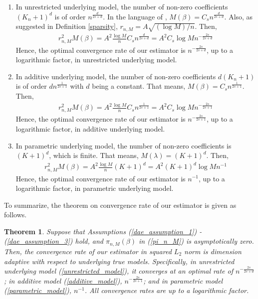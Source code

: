 \documentclass[12pt, a4paper]{article}
\theoremstyle{MAstyle} \newtheorem{assumption}{Assumption}[section]
\theoremstyle{MAstyle} \newtheorem{definition}{Definition}[section]
\theoremstyle{MAstyle} \newtheorem{theorem}{Theorem}[section]
\theoremstyle{MAstyle} \newtheorem{corollary}{Corollary}[section]
\begin{document}
                    \begin{enumerate}[label=(\alph*), noitemsep]
                        \item In unrestricted underlying model, the number of non-zero coefficients $(K_n+1)^d$ is of order $n^{\frac{d}{2s+d}}$. In the language of \cite{Bunea_2007}, $M(\beta)=C_sn^{\frac{d}{2s+d}}$. Also, as suggested in Definition \ref{sparsity}, $r_{n,M}=A\sqrt{(\log M)/n}$. Then,
                        \begin{align*}
                            r_{n,M}^2M(\beta)= A^2 \frac{\log M}{n} C_sn^{\frac{d}{2s+d}} = A^2C_s \log M n^{-\frac{2s}{2s+d}}
                        \end{align*}
                        Hence, the optimal convergence rate of our estimator is $n^{-\frac{2s}{2s+d}}$, up to a logarithmic factor, in unrestricted underlying model.

                        \item In additive underlying model, the number of non-zero coefficients $d(K_n+1)$ is of order $dn^{\frac{1}{2s+1}}$ with $d$ being a constant. That means, $M(\beta)=C_sn^{\frac{1}{2s+1}}$. Then, 
                        \begin{align*}
                            r_{n,M}^2M(\beta)=A^2 \frac{\log M}{n}C_sn^{\frac{1}{2s+1}}=A^2 C_s \log M n^{-\frac{2s}{2s+1}}
                        \end{align*}
                        Hence, the optimal convergence rate of our estimator is $n^{-\frac{2s}{2s+1}}$, up to a logarithmic factor, in additive underlying model. 

                        \item In parametric underlying model, the number of non-zero coefficients is $(K+1)^d$, which is finite. That means, $M(\lambda)=(K+1)^d$. Then,
                        \begin{align*}
                            r_{n,M}^2M(\beta)=A^2 \frac{\log M}{n}(K+1)^d=A^2(K+1)^d\log M n^{-1}
                        \end{align*}
                        Hence, the optimal convergence rate of our estimator is $n^{-1}$, up to a logarithmic factor, in parametric underlying model. 
                    \end{enumerate}

                    To summarize, the theorem on convergence rate of our estimator is given as follows.
                    \begin{theorem}\label{convergence_rates_theorem}
                        Suppose that Assumptions (\ref{dae_assumption_1}) - (\ref{dae_assumption_3}) hold, and $\pi_{n,M}(\beta)$ in (\ref{pi_n_M}) is asymptotically zero. Then, the convergence rate of our estimator in squared $L_2$ norm is dimension adaptive with respect to underlying true models. Specifically, in unrestricted underlying model (\ref{unrestricted_model}), it converges at an optimal rate of $n^{-\frac{2s}{2s+d}}$; in additive model (\ref{additive_model}), $n^{-\frac{2s}{2s+1}}$; and in parametric model (\ref{parametric_model}), $n^{-1}$. All convergence rates are up to a logarithmic factor. 
                    \end{theorem}
\end{document}
